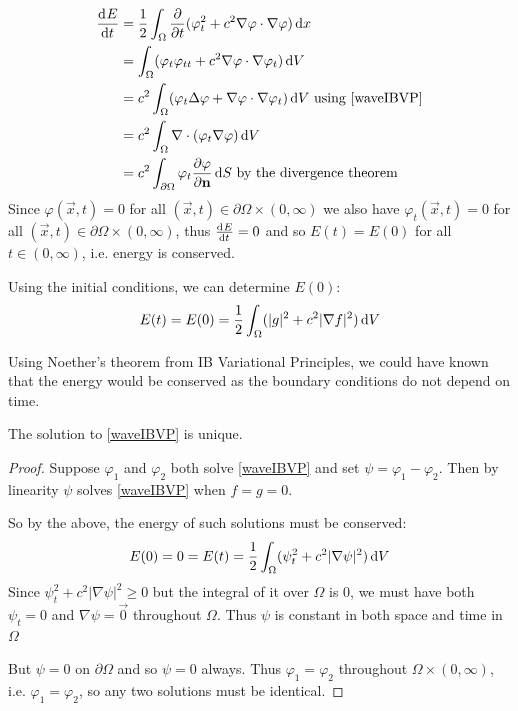 \documentclass[../main.tex]{subfiles}
\begin{document}
\begin{align*}
  \deriv{E}{t} &= \frac{1}{2} \int_{\Omega} \pderiv{}{t}(\varphi^2_t + c^2 \nabla \varphi \cdot \nabla \varphi) \d{x} \\
               &= \int_{\Omega} (\varphi_t \varphi_{tt} + c^2 \nabla \varphi \cdot \nabla \varphi_t) \d{V} \\
               &= c^2 \int_{\Omega} (\varphi_t \Delta \varphi + \nabla \varphi \cdot \nabla \varphi_t) \d{V} \text{ using \cref{waveIBVP}} \\
               &= c^2 \int_{\Omega} \nabla \cdot (\varphi_t \nabla \varphi) \d{V} \\
               &= c^2 \int_{\partial \Omega} \varphi_t \pderiv{\varphi}{\vec{n}} \d{S} \text{ by the divergence theorem}
\end{align*}
Since $\varphi(\vec{x}, t) = 0$ for all $(\vec{x}, t) \in \partial \Omega \times (0, \infty)$ we also have $\varphi_t(\vec{x}, t) = 0$ for all $(\vec{x}, t) \in \partial \Omega \times (0, \infty)$, thus $\deriv{E}{t} = 0$ and so $E(t) = E(0)$ for all $t \in (0, \infty)$, i.e. energy is conserved.

Using the initial conditions, we can determine $E(0)$:
\[
  E(t) = E(0) = \frac{1}{2} \int_{\Omega} (|g|^2 + c^2 |\nabla f|^2) \d{V}
\]
\begin{remark}
  Using Noether's theorem from IB Variational Principles, we could have known that the energy would be conserved as the boundary conditions do not depend on time.
\end{remark}
\begin{proposition}
  The solution to \cref{waveIBVP} is unique.
\end{proposition}
\begin{proof}
  Suppose $\varphi_1$ and $\varphi_2$ both solve \cref{waveIBVP} and set $\psi = \varphi_1 - \varphi_2$.
  Then by linearity $\psi$ solves \cref{waveIBVP} when $f = g = 0$.

  So by the above, the energy of such solutions must be conserved:
  \[
    E(0) = 0 = E(t) = \frac{1}{2} \int_{\Omega} (\psi^2_t + c^2 |\nabla \psi|^2) \d{V}
  \]
  Since $\psi^2_t + c^2 |\nabla \psi|^2 \geq 0$ but the integral of it over $\Omega$ is 0, we must have both $\psi_t = 0$ and $\nabla \psi = \vec{0}$ throughout $\Omega$.
  Thus $\psi$ is constant in both space and time in $\Omega$

  But $\psi = 0$ on $\partial \Omega$ and so $\psi = 0$ always.
  Thus $\varphi_1 = \varphi_2$ throughout $\Omega \times (0, \infty)$, i.e. $\varphi_1 = \varphi_2$, so any two solutions must be identical.
\end{proof}
\end{document}
